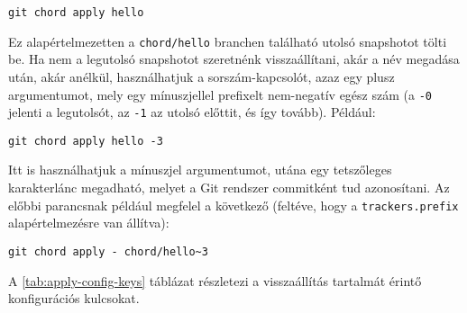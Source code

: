 \documentclass[
]{elteikthesis}[2025/03/25]
\begin{document}
\begin{verbatim}
git chord apply hello
\end{verbatim}

Ez alapértelmezetten a \verb|chord/hello| branchen található utolsó snapshotot tölti be.
Ha nem a legutolsó snapshotot szeretnénk visszaállítani, akár a név megadása után, akár anélkül,
használhatjuk a sorszám-kapcsolót, azaz egy plusz argumentumot, mely egy mínuszjellel prefixelt nem-negatív egész szám
(a \verb|-0| jelenti a legutolsót, az \verb|-1| az utolsó előttit, és így tovább).
Például:

\begin{verbatim}
git chord apply hello -3
\end{verbatim}

Itt is használhatjuk a mínuszjel argumentumot, utána egy tetszőleges karakterlánc megadható,
melyet a Git rendszer commitként tud azonosítani.
Az előbbi parancsnak például megfelel a következő (feltéve, hogy a \verb|trackers.prefix| alapértelmezésre van állítva):

\begin{verbatim}
git chord apply - chord/hello~3
\end{verbatim}

A \ref{tab:apply-config-keys} táblázat részletezi a visszaállítás tartalmát érintő konfigurációs kulcsokat.
\end{document}
